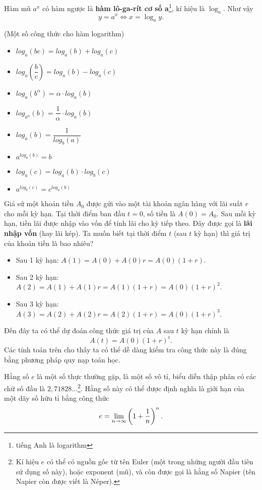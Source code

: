 

Hàm mũ $a^x$ có hàm ngược là \textbf{hàm lô-ga-rít cơ số a}\footnote{tiếng Anh là logarithm}, kí hiệu là $\log_a$. Như vậy
\[ y = a^x \iff x = \log_a y. \]

\begin{proposition}
    (Một số công thức cho hàm logarithm)
    \begin{itemize}
        \item $log_a(bc) = log_a(b) + log_a(c)$
        \item $log_a(\dfrac{b}{c}) = log_a(b) - log_a(c)$
        \item $log_a(b^{\alpha}) = \alpha \cdot log_a(b)$
        \item $log_{a^{\alpha}}(b) = \dfrac{1}{\alpha} \cdot log_a(b) $
        \item $log_a(b) = \dfrac{1}{log_b(a)}$
        \item $a^{log_a(b)} = b$
        \item $log_a(c) = log_a(b) \cdot log_b(c)$
        \item $a^{log_b(c)} = c^{log_a(b)}$
    \end{itemize}
\end{proposition}

\begin{example}
    Giả sử một khoản tiền $A_0$ được gửi vào một tài khoản ngân hàng với lãi suất $r$ cho mỗi kỳ hạn. Tại thời điểm ban đầu $t=0$, số tiền là $A(0) = A_0$. Sau mỗi kỳ hạn, tiền lãi được nhập vào vốn để tính lãi cho kỳ tiếp theo. Đây được gọi là \textbf{lãi nhập vốn} (hay lãi kép). Ta muốn biết tại thời điểm $t$ (sau $t$ kỳ hạn) thì giá trị của khoản tiền là bao nhiêu?
    \begin{itemize}
        \item Sau 1 kỳ hạn: $A(1) = A(0) + A(0)r = A(0)(1+r)$.
        \item Sau 2 kỳ hạn: $A(2) = A(1) + A(1)r = A(1)(1+r) = A(0)(1+r)^2$.
        \item Sau 3 kỳ hạn: $A(3) = A(2) + A(2)r = A(2)(1+r) = A(0)(1+r)^3$.
    \end{itemize}
    Đến đây ta có thể dự đoán công thức giá trị của $A$ sau $t$ kỳ hạn chính là
    \[ A(t) = A(0)(1+r)^t. \]
    Các tính toán trên cho thấy ta có thể dễ dàng kiểm tra công thức này là đúng bằng phương pháp quy nạp toán học.
\end{example}

Hằng số $e$ là một số thực thường gặp, là một số vô tỉ, biểu diễn thập phân có các chữ số đầu là $2,71828\dots$\footnote{Kí hiệu $e$ có thể có nguồn gốc từ tên Euler (một trong những người đầu tiên sử dụng số này), hoặc exponent (mũ), và còn được gọi là hằng số Napier (tên Napier còn được viết là Néper).}. Hằng số này có thể được định nghĩa là giới hạn của một dãy số hữu tỉ bằng công thức
\[ e = \lim\limits_{n \to \infty} \left(1 + \dfrac{1}{n}\right)^n. \]

